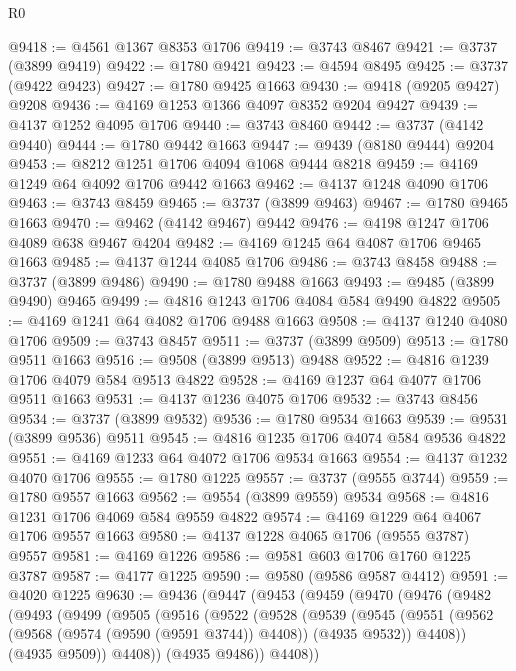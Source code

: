 \begin{lexlean}{R0}
\begin{coremodule}
@9418 := @4561 @1367 @8353 @1706
@9419 := @3743 @8467
@9421 := @3737 (@3899 @9419)
@9422 := @1780 @9421
@9423 := @4594 @8495
@9425 := @3737 (@9422 @9423)
@9427 := @1780 @9425 @1663
@9430 := @9418 (@9205 @9427) @9208
@9436 := @4169 @1253 @1366 @4097 @8352 @9204 @9427
@9439 := @4137 @1252 @4095 @1706
@9440 := @3743 @8460
@9442 := @3737 (@4142 @9440)
@9444 := @1780 @9442 @1663
@9447 := @9439 (@8180 @9444) @9204
@9453 := @8212 @1251 @1706 @4094 @1068 @9444 @8218
@9459 := @4169 @1249 @64 @4092 @1706 @9442 @1663
@9462 := @4137 @1248 @4090 @1706
@9463 := @3743 @8459
@9465 := @3737 (@3899 @9463)
@9467 := @1780 @9465 @1663
@9470 := @9462 (@4142 @9467) @9442
@9476 := @4198 @1247 @1706 @4089 @638 @9467 @4204
@9482 := @4169 @1245 @64 @4087 @1706 @9465 @1663
@9485 := @4137 @1244 @4085 @1706
@9486 := @3743 @8458
@9488 := @3737 (@3899 @9486)
@9490 := @1780 @9488 @1663
@9493 := @9485 (@3899 @9490) @9465
@9499 := @4816 @1243 @1706 @4084 @584 @9490 @4822
@9505 := @4169 @1241 @64 @4082 @1706 @9488 @1663
@9508 := @4137 @1240 @4080 @1706
@9509 := @3743 @8457
@9511 := @3737 (@3899 @9509)
@9513 := @1780 @9511 @1663
@9516 := @9508 (@3899 @9513) @9488
@9522 := @4816 @1239 @1706 @4079 @584 @9513 @4822
@9528 := @4169 @1237 @64 @4077 @1706 @9511 @1663
@9531 := @4137 @1236 @4075 @1706
@9532 := @3743 @8456
@9534 := @3737 (@3899 @9532)
@9536 := @1780 @9534 @1663
@9539 := @9531 (@3899 @9536) @9511
@9545 := @4816 @1235 @1706 @4074 @584 @9536 @4822
@9551 := @4169 @1233 @64 @4072 @1706 @9534 @1663
@9554 := @4137 @1232 @4070 @1706
@9555 := @1780 @1225
@9557 := @3737 (@9555 @3744)
@9559 := @1780 @9557 @1663
@9562 := @9554 (@3899 @9559) @9534
@9568 := @4816 @1231 @1706 @4069 @584 @9559 @4822
@9574 := @4169 @1229 @64 @4067 @1706 @9557 @1663
@9580 := @4137 @1228 @4065 @1706 (@9555 @3787) @9557
@9581 := @4169 @1226
@9586 := @9581 @603 @1706 @1760 @1225 @3787
@9587 := @4177 @1225
@9590 := @9580 (@9586 @9587 @4412)
@9591 := @4020 @1225
@9630 := @9436
    (@9447
      (@9453
        (@9459
          (@9470
            (@9476
              (@9482
                (@9493
                  (@9499
                    (@9505
                      (@9516
                        (@9522
                          (@9528
                            (@9539
                              (@9545
                                (@9551
                                  (@9562 (@9568 (@9574 (@9590 (@9591 @3744)) @4408)) (@4935 @9532))
                                  @4408))
                              (@4935 @9509))
                            @4408))
                        (@4935 @9486))
                      @4408))

\end{coremodule}
\end{lexlean}
